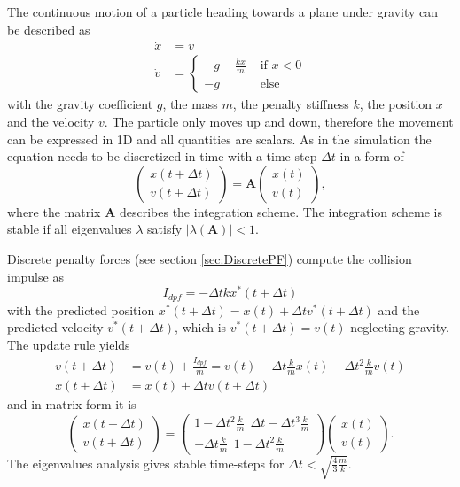 The continuous motion of a particle heading towards a plane under gravity can be described as
\begin{align}
\dot x &=v \\
 \dot v &=
\begin{cases}
-g-\frac{kx}{m} & \text{ if } x<0 \\
-g & \text{ else }
\end{cases}
\end{align}
with the gravity coefficient $g$, the mass $m$, the penalty stiffness $k$, the position $x$ and the velocity $v$. The particle only moves up and down, therefore the movement can be expressed in 1D and all quantities are scalars.  As in the simulation the equation needs to be discretized in time with a time step $\Delta t$ in a form of
\begin{equation}
\label{eq::update_form}
	\begin{pmatrix}
		x(t+\Delta t) \\
		v(t+\Delta t) 
	\end{pmatrix}=\mathbf A
		\begin{pmatrix}
			x(t) \\
			v(t) 
		\end{pmatrix},
\end{equation}
where the matrix $\mathbf A$ describes the integration scheme. The integration scheme is stable if all eigenvalues $\lambda$ satisfy $|\lambda(\mathbf{A})|<1$.

Discrete penalty forces (see section \ref{sec:DiscretePF}) compute the collision impulse as
\begin{equation}
I_{dpf}=-\Delta t kx^*(t+\Delta t)
\end{equation}
with the predicted position $x^*(t+\Delta t)=x(t)+\Delta t  v^*(t+\Delta t)$ and the predicted velocity $v^*(t+\Delta t)$, which is $v^*(t+\Delta t)=v(t)$ neglecting gravity. The update rule yields
\begin{align}
	v(t+\Delta t)&=v(t)+\frac{I_{dpf}}{m}=v(t)-\Delta t \frac{k}{m} x(t)-\Delta t^2 \frac{k}{m} v(t) \\
	x(t+\Delta t)&=x(t)+\Delta t v(t+\Delta t)	
\end{align}
and in matrix form it is
\begin{equation}
	\begin{pmatrix}
		x(t+\Delta t) \\
		v(t+\Delta t) 
	\end{pmatrix}=	
		\begin{pmatrix}
			1-\Delta t^2\frac{k}{m} \ \ \Delta t - \Delta t^3\frac{k}{m}  \\
		-\Delta t\frac{k}{m} \ \ 1- \Delta t^2 \frac{k}{m}
		\end{pmatrix}
		\begin{pmatrix}
			x(t) \\
			v(t) 
		\end{pmatrix}.
\end{equation}
The eigenvalues analysis gives stable time-steps for $\Delta t< \sqrt{\frac{4}{3}\frac{m}{k}}$.

